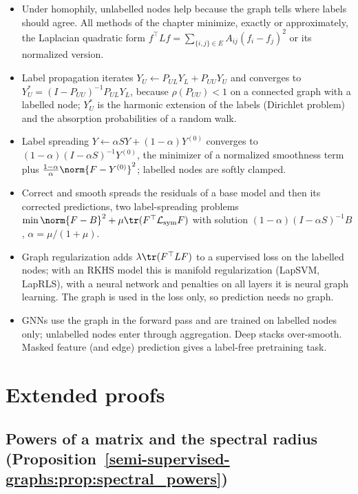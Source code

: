 \begin{notechapter}
\begin{chaptersummary}
\begin{itemize}
\item Under homophily, unlabelled nodes help because the graph tells where labels should agree. All methods of the chapter minimize, exactly or approximately, the Laplacian quadratic form $f^\top Lf = \sum_{\{i,j\}\in E}A_{ij}(f_i - f_j)^2$ or its normalized version.
\item Label propagation iterates $Y_U \leftarrow P_{UL}Y_L + P_{UU}Y_U$ and converges to $Y_U^* = (I - P_{UU})^{-1}P_{UL}Y_L$, because $\rho(P_{UU}) < 1$ on a connected graph with a labelled node; $Y_U^*$ is the harmonic extension of the labels (Dirichlet problem) and the absorption probabilities of a random walk.
\item Label spreading $Y \leftarrow \alpha SY + (1-\alpha)Y^{(0)}$ converges to $(1-\alpha)(I - \alpha S)^{-1}Y^{(0)}$, the minimizer of a normalized smoothness term plus $\frac{1-\alpha}{\alpha}\norm{F - Y^{(0)}}^2$; labelled nodes are softly clamped.
\item Correct and smooth spreads the residuals of a base model and then its corrected predictions, two label-spreading problems $\min\norm{F - B}^2 + \mu\tr(F^\top\mathcal L_{\mathrm{sym}}F)$ with solution $(1-\alpha)(I - \alpha S)^{-1}B$, $\alpha = \mu/(1+\mu)$.
\item Graph regularization adds $\lambda\tr(F^\top LF)$ to a supervised loss on the labelled nodes; with an RKHS model this is manifold regularization (LapSVM, LapRLS), with a neural network and penalties on all layers it is neural graph learning. The graph is used in the loss only, so prediction needs no graph.
\item GNNs use the graph in the forward pass and are trained on labelled nodes only; unlabelled nodes enter through aggregation. Deep stacks over-smooth. Masked feature (and edge) prediction gives a label-free pretraining task.
\end{itemize}
\end{chaptersummary}

\chapterappendix
\section{Extended proofs}
\label{semi-supervised-graphs:app:proofs}

\subsection{Powers of a matrix and the spectral radius
  (Proposition~\ref{semi-supervised-graphs:prop:spectral_powers})}
\label{semi-supervised-graphs:app:spectral_radius}


\end{notechapter}
